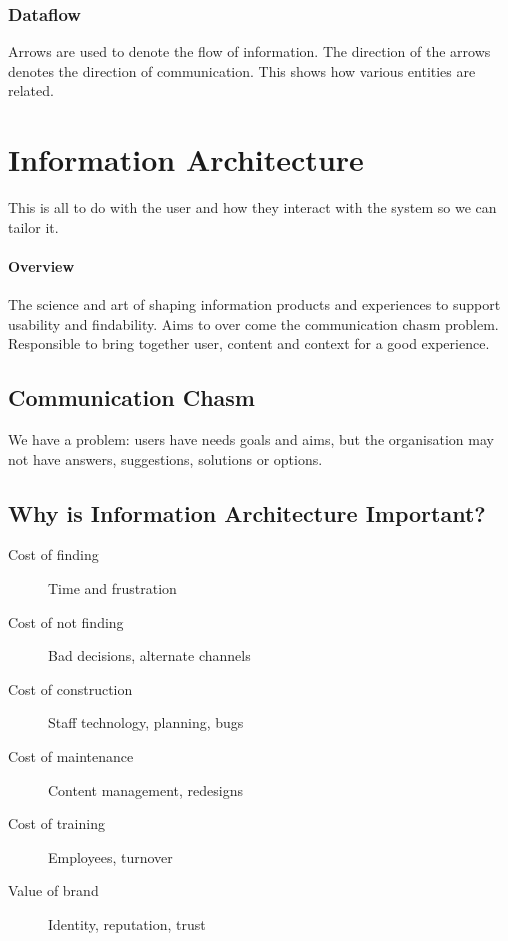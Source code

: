 \subsubsection{Dataflow}\label{ssub:dataflow_was}

Arrows are used to denote the flow of information.
The direction of the arrows denotes the direction of communication.
This shows how various entities are related.

\section{Information Architecture}\label{sec:information_architecture}

This is all to do with the user and how they interact with the system so we can tailor it.

\paragraph{Overview}\label{par:overview_was}

The science and art of shaping information products and experiences to support usability and findability.
Aims to over come the communication chasm problem.
Responsible  to bring together user, content and context for a good experience.

\subsection{Communication Chasm}\label{sub:communication_chasm}

We have a problem: users have needs goals and aims, but the organisation may not have answers, suggestions, solutions or options.

\subsection{Why is Information Architecture Important?}\label{sub:why_is_information_architecture_important_}

\begin{description}
	\item[Cost of finding] Time and frustration
	\item[Cost of not finding] Bad decisions, alternate channels
	\item[Cost of construction] Staff technology, planning, bugs
	\item[Cost of maintenance] Content management, redesigns
	\item[Cost of training] Employees, turnover
	\item[Value of brand] Identity, reputation, trust
\end{description}

